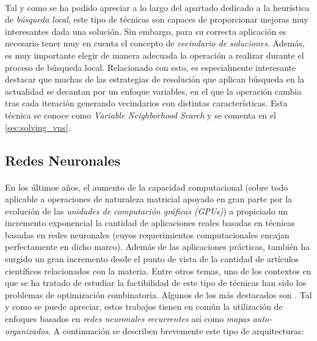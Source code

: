 \documentclass{subfiles}
\begin{document}
        \paragraph{}
        Tal y como se ha podido apreciar a lo largo del apartado dedicado a la heurística de \emph{búsqueda local}, este tipo de técnicas son capaces de proporcionar mejoras muy interesantes dada una solución. Sin embargo, para su correcta aplicación es necesario tener muy en cuenta el concepto de \emph{vecindario de soluciones}. Además, es muy importante elegir de manera adecuada la operación a realizar durante el proceso de búsqueda local. Relacionado con esto, es especialmente interesante destacar que muchas de las estrategias de resolución que aplican búsqueda en la actualidad se decantan por un enfoque variables, en el que la operación cambia tras cada iteración generando vecindarios con distintas características. Esta técnica se conoce como \emph{Variable Neighborhood Search} y se comenta en el \cref{sec:solving_vns}.

      \subsection{Redes Neuronales}
      \label{sec:solving_neural_networks}

        \paragraph{}
        En los últimos años, el aumento de la capacidad computacional (sobre todo aplicable a operaciones de naturaleza matricial apoyado en gran parte por la evolución de las \emph{unidades de computación gráficas (GPUs)}) a propiciado un incremento exponencial la cantidad de aplicaciones reales basadas en técnicas basadas en redes neuronales (cuyos requerimientos computacionales encajan perfectamente en dicho marco). Además de las aplicaciones prácticas, también ha surgido un gran incremento desde el punto de vista de la cantidad de artículos científicos relacionados con la materia. Entre otros temas, uno de los contextos en que se ha tratado de estudiar la factibilidad de este tipo de técnicas han sido los problemas de optimización combinatoria. Algunos de los más destacados son \cite{potvin1993state,ghaziri2003neural,leung2004expanding,masutti2009self,bello2016neural}. Tal y como se puede apreciar, estos trabajos tienen en común la utilización de enfoques basados en \emph{redes neuronales recurrentes} así como \emph{mapas auto-organizados}. A continuación se describen brevemente este tipo de arquitecturas:
\end{document}
